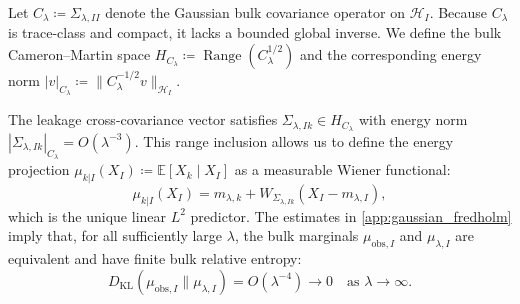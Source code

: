 \documentclass[preprint,12pt]{elsarticle}
\theoremstyle{plain}
\theoremstyle{definition}
\theoremstyle{remark}
\newcommand{\KL}{D_{\operatorname{KL}}}
\newcommand{\E}{\mathbb{E}}
\newcommand{\Range}{\operatorname{Range}}
\begin{document}
    Let $C_\lambda \coloneqq \Sigma_{\lambda,II}$ denote the Gaussian bulk covariance operator on $\mathcal{H}_I$. Because $C_\lambda$ is trace-class and compact, it lacks a bounded global inverse. We define the bulk Cameron--Martin space $H_{C_\lambda} \coloneqq \Range(C_\lambda^{1/2})$ and the corresponding energy norm $|v|_{C_\lambda}\coloneqq\|C_\lambda^{-1/2}v\|_{\mathcal{H}_I}$.

    The leakage cross-covariance vector satisfies $\Sigma_{\lambda,Ik} \in H_{C_\lambda}$ with energy norm $|\Sigma_{\lambda,Ik}|_{C_\lambda} = O(\lambda^{-3})$. This range inclusion allows us to define the energy projection $\mu_{k|I}(X_I) \coloneqq \E[X_k \mid X_I]$ as a measurable Wiener functional:
    \begin{equation}
        \mu_{k|I}(X_I) = m_{\lambda,k} + W_{\Sigma_{\lambda,Ik}}(X_I - m_{\lambda,I}),
    \end{equation}
    which is the unique linear $L^2$ predictor. The estimates in \ref{app:gaussian_fredholm} imply that, for all sufficiently large $\lambda$, the bulk marginals $\mu_{\text{obs},I}$ and $\mu_{\lambda,I}$ are equivalent and have finite bulk relative entropy:
    \begin{equation}
        \KL(\mu_{\text{obs},I} \parallel \mu_{\lambda,I}) = O(\lambda^{-4}) \to 0 \quad \text{as } \lambda \to \infty.
    \end{equation}
\end{document}
